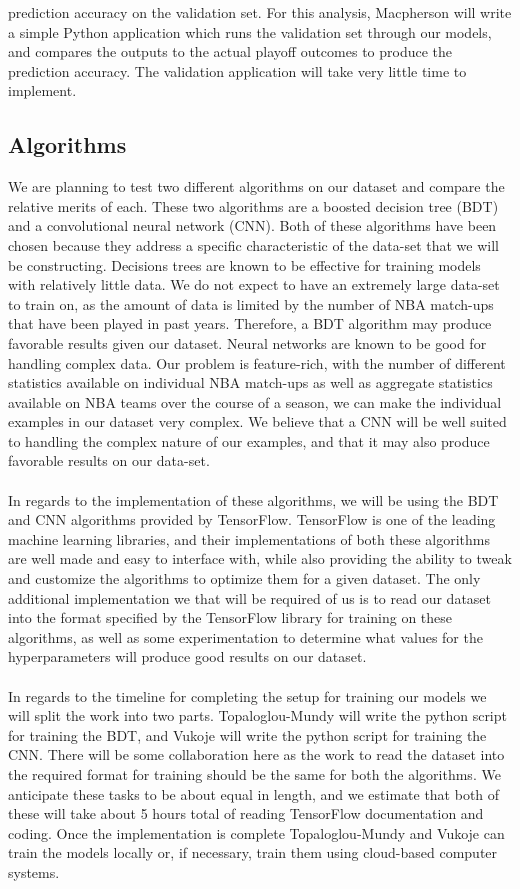 \documentclass[letterpaper]{article} %
\begin{document}
prediction accuracy on the validation set. For this analysis, Macpherson will write a simple Python application which runs the validation set through our models, and compares the outputs to the actual playoff outcomes to produce the prediction accuracy. The validation application will take very little time to implement.

\subsection{Algorithms}

We are planning to test two different algorithms on our dataset and compare the relative merits of each. These two algorithms are a boosted decision tree (BDT) and a convolutional neural network (CNN). Both of these algorithms have been chosen because they address a specific characteristic of the data-set that we will be constructing. Decisions trees are known to be effective for training models with relatively little data. We do not expect to have an extremely large data-set to train on, as the amount of data is limited by the number of NBA match-ups that have been played in past years. Therefore, a BDT algorithm may produce favorable results given our dataset. Neural networks are known to be good for handling complex data. Our problem is feature-rich, with the number of different statistics available on individual NBA match-ups as well as aggregate statistics available on NBA teams over the course of a season, we can make the individual examples in our dataset very complex. We believe that a CNN will be well suited to handling the complex nature of our examples, and that it may also produce favorable results on our data-set. \\ \\ 
In regards to the implementation of these algorithms, we will be using the BDT and CNN algorithms provided by TensorFlow. TensorFlow is one of the leading machine learning libraries, and their implementations of both these algorithms are well made and easy to interface with, while also providing the ability to tweak and customize the algorithms to optimize them for a given dataset. The only additional implementation we that will be required of us is to read our dataset into the format specified by the TensorFlow library for training on these algorithms, as well as some experimentation to determine what values for the hyperparameters will produce good results on our dataset. \\ \\	
In regards to the timeline for completing the setup for training our models we will split the work into two parts. Topaloglou-Mundy will write the python script for training the BDT, and Vukoje will write the python script for training the CNN. There will be some collaboration here as the work to read the dataset into the required format for training should be the same for both the algorithms. We anticipate these tasks to be about equal in length, and we estimate that both of these will take about 5 hours total of reading TensorFlow documentation and coding. Once the implementation is complete Topaloglou-Mundy and Vukoje can train the models locally or, if necessary, train them using cloud-based computer systems.
\end{document}
